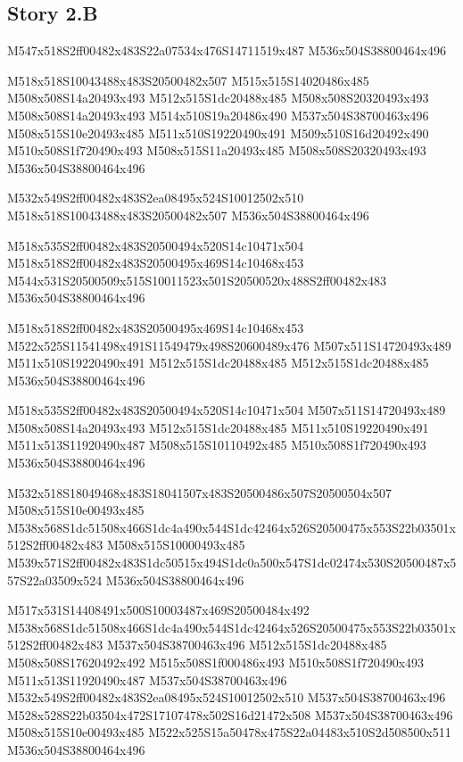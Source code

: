 \documentclass{article}
\begin{document}
\subsection{Story 2.B}

\begin{multicols}{5}
\begin{center}
M547x518S2ff00482x483S22a07534x476S14711519x487 %
M536x504S38800464x496 %

M518x518S10043488x483S20500482x507 %
M515x515S14020486x485 %
M508x508S14a20493x493 %
M512x515S1dc20488x485 %
M508x508S20320493x493 %
M508x508S14a20493x493 %
M514x510S19a20486x490 %
M537x504S38700463x496 %
M508x515S10e20493x485 %
M511x510S19220490x491 %
M509x510S16d20492x490 %
M510x508S1f720490x493 %
M508x515S11a20493x485 %
M508x508S20320493x493 %
M536x504S38800464x496 %

M532x549S2ff00482x483S2ea08495x524S10012502x510 %
M518x518S10043488x483S20500482x507 %
M536x504S38800464x496 %

M518x535S2ff00482x483S20500494x520S14c10471x504 %
M518x518S2ff00482x483S20500495x469S14c10468x453 %
M544x531S20500509x515S10011523x501S20500520x488S2ff00482x483 %
M536x504S38800464x496 %

M518x518S2ff00482x483S20500495x469S14c10468x453 %
M522x525S11541498x491S11549479x498S20600489x476 %
M507x511S14720493x489 %
M511x510S19220490x491 %
M512x515S1dc20488x485 %
M512x515S1dc20488x485 %
M536x504S38800464x496 %

M518x535S2ff00482x483S20500494x520S14c10471x504 %
M507x511S14720493x489 %
M508x508S14a20493x493 %
M512x515S1dc20488x485 %
M511x510S19220490x491 %
M511x513S11920490x487 %
M508x515S10110492x485 %
M510x508S1f720490x493 %
M536x504S38800464x496 %

M532x518S18049468x483S18041507x483S20500486x507S20500504x507 %
M508x515S10e00493x485 %
M538x568S1dc51508x466S1dc4a490x544S1dc42464x526S20500475x553S22b03501x512S2ff00482x483 %
M508x515S10000493x485 %
M539x571S2ff00482x483S1dc50515x494S1dc0a500x547S1dc02474x530S20500487x557S22a03509x524 %
M536x504S38800464x496 %

M517x531S14408491x500S10003487x469S20500484x492 %
M538x568S1dc51508x466S1dc4a490x544S1dc42464x526S20500475x553S22b03501x512S2ff00482x483 %
M537x504S38700463x496 %
M512x515S1dc20488x485 %
M508x508S17620492x492 %
M515x508S1f000486x493 %
M510x508S1f720490x493 %
M511x513S11920490x487 %
M537x504S38700463x496 %
M532x549S2ff00482x483S2ea08495x524S10012502x510 %
M537x504S38700463x496 %
M528x528S22b03504x472S17107478x502S16d21472x508 %
M537x504S38700463x496 %
M508x515S10e00493x485 %
M522x525S15a50478x475S22a04483x510S2d508500x511 %
M536x504S38800464x496 %


\end{center}
\end{multicols}
\end{document}

